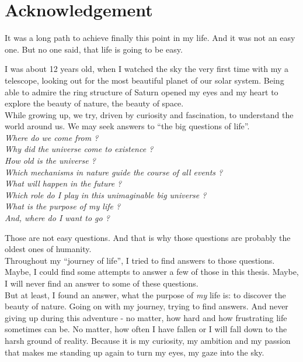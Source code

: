 \chapter*{Acknowledgement}
\thispagestyle{empty}

\noindent It was a long path to achieve finally this point in my life. And it was not an easy one. But no one said, that life is going to be easy.

\noindent I was about 12 years old, when I watched the sky the very first time with my a telescope, looking out for the most beautiful planet of our solar system. Being able to admire the ring structure of Saturn opened my eyes and my heart to explore the beauty of nature, the beauty of space. \\

\noindent While growing up, we try, driven by curiosity and fascination, to understand the world around us. We may seek answers to ``the big questions of life''. \\ 

{ \itshape
\noindent Where do we come from ? \\
Why did the universe come to existence ? \\
How old is the universe ? \\
Which mechanisms in nature guide the course of all events ? \\
What will happen in the future ? \\
Which role do I play in this unimaginable big universe ? \\
What is the purpose of my life ? \\
And, where do I want to go ? \\
}

\noindent Those are not easy questions. And that is why those questions are probably the oldest ones of humanity. \\
Throughout my ``journey of life'', I tried to find answers to those questions. Maybe, I could find some attempts to answer a few of those in this thesis. Maybe, I will never find an answer to some of these questions. \\

\noindent But at least, I found an answer, what the purpose of \textit{my} life is: to discover the beauty of nature. Going on with my journey, trying to find answers. And never giving up during this adventure - no matter, how hard and how frustrating life sometimes can be. No matter, how often I have fallen or I will fall down to the harsh ground of reality. Because it is my curiosity, my ambition and my passion that makes me standing up again to turn my eyes, my gaze into the sky. \\ 

